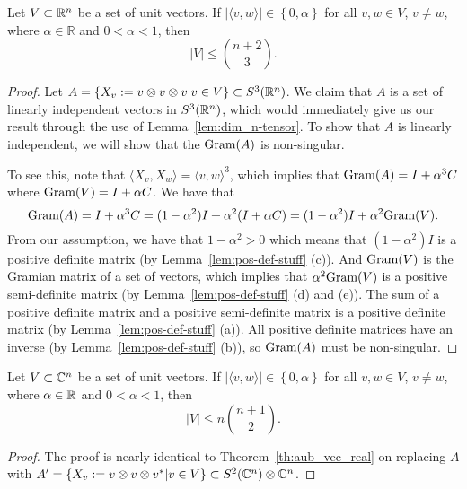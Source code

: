 \begin{theorem}\label{th:aub_vec_real}
  Let $V \subset \mathbb{R}^n$ be a set of unit vectors. If $|\langle v,w\rangle| \in \left\{0,\alpha\right\}$ for all $v,w\in V$, $v\neq w$, where $\alpha \in \mathbb{R}$ and $0 < \alpha < 1$, then
  \begin{equation}\label{eq:aub_vec_real}|V|\leq \binom{n+2}{3}.\end{equation}
  
  \begin{proof}
   Let $A = \{X_v := v \otimes v \otimes v | v \in V\} \subset S^3(\mathbb{R}^n)$. We claim that $A$ is a set of linearly independent vectors in $S^3(\mathbb{R}^n)$, which would immediately give us our result through the use of Lemma~\ref{lem:dim_n-tensor}. To show that $A$ is linearly independent, we will show that the $\text{Gram}(A)$ is non-singular.

   To see this, note that $\langle X_v , X_w \rangle = \langle v , w \rangle^3$, which implies that $\text{Gram}(A) = I+\alpha^3 C$ where $\text{Gram}(V) = I+\alpha C$. We have that $$\text{Gram}(A) = I+\alpha^3C = (1 - \alpha^2)I + \alpha^2(I+\alpha C) = (1 - \alpha^2)I + \alpha^2\text{Gram}(V).$$ From our assumption, we have that $1 - \alpha^2 > 0$ which means that $(1 - \alpha^2)I$ is a positive definite matrix (by Lemma~\ref{lem:pos-def-stuff} (c)). And $\text{Gram}(V)$ is the Gramian matrix of a set of vectors, which implies that $\alpha^2\text{Gram}(V)$ is a positive semi-definite matrix (by Lemma~\ref{lem:pos-def-stuff} (d) and (e)). The sum of a positive definite matrix and a positive semi-definite matrix is a positive definite matrix (by Lemma~\ref{lem:pos-def-stuff} (a)). All positive definite matrices have an inverse (by Lemma~\ref{lem:pos-def-stuff} (b)), so $\text{Gram}(A)$ must be non-singular.
  \end{proof}

\end{theorem}

\begin{theorem}\label{th:aub_vec_complex}
 Let $V \subset \mathbb{C}^n$ be a set of unit vectors. If $|\langle v,w\rangle| \in \left\{0,\alpha\right\}$ for all $v,w\in V$, $v\neq w$, where $\alpha \in \mathbb{R}$ and $0 < \alpha < 1$, then
  \begin{equation}\label{eq:aub_vec_complex}|V|\leq n\binom{n+1}{2}.\end{equation}

 \begin{proof}
  The proof is nearly identical to Theorem~\ref{th:aub_vec_real} on replacing $A$ with $A' = \{X_v := v \otimes v \otimes v^* | v \in V\} \subset S^2(\mathbb{C}^n) \otimes \mathbb{C}^n$.
 \end{proof}

\end{theorem}

